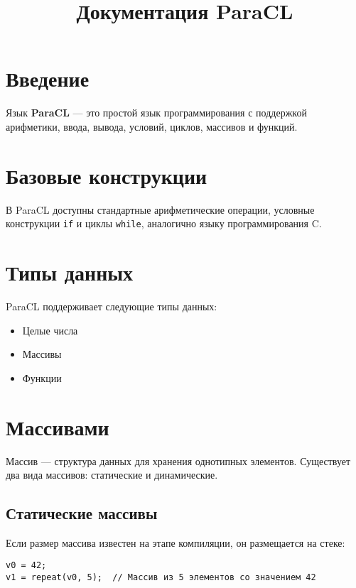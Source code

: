 \documentclass[a4paper,12pt]{article}
\title{Документация ParaCL}
\date{}
\begin{document}
\maketitle %

\tableofcontents
\newpage

\section{Введение}

Язык \textbf{ParaCL} — это простой язык программирования с поддержкой арифметики, ввода, вывода, условий, циклов, массивов и функций.

\section{Базовые конструкции}

В ParaCL доступны стандартные арифметические операции, условные конструкции \texttt{if} и циклы \texttt{while}, аналогично языку программирования C.

\section{Типы данных}
ParaCL поддерживает следующие типы данных:
\begin{itemize}
    \item Целые числа
    \item Массивы
    \item Функции
\end{itemize}

\section{Массивами}

Массив — структура данных для хранения однотипных элементов. Существует два вида массивов: статические и динамические.

\subsection{Статические массивы}

Если размер массива известен на этапе компиляции, он размещается на стеке:

\begin{tcolorbox}[colback=bg, colframe=frame, title=Пример статического массива]
\begin{verbatim}
v0 = 42;
v1 = repeat(v0, 5);  // Массив из 5 элементов со значением 42
\end{verbatim}
\end{tcolorbox}
\end{document}
